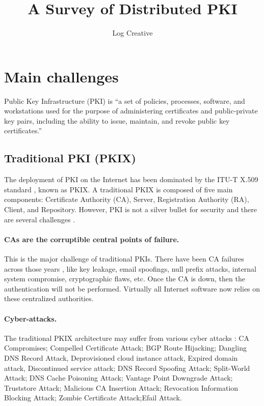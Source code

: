 \documentclass[lang=en]{sjtuarticle}
\title{A Survey of Distributed PKI}
\author{Log Creative}
\begin{document}
\maketitle

\tableofcontents*

\section{Main challenges}

Public Key Infrastructure (PKI) is ``a set of policies, processes, software, and workstations
used for the purpose of administering certificates and public-private key pairs, including the ability to
issue, maintain, and revoke public key certificates\cite{nist}.''

\subsection{Traditional PKI (PKIX)}

The deployment of PKI on the Internet has been dominated by the ITU-T X.509 standard \cite{pkix}, known as PKIX. A traditional PKIX is composed of five main components: Certificate Authority (CA), Server, Registration Authority (RA), Client, and Repository. However, PKI is not a silver bullet for security and there are several challenges \cite{ellison2000ten}.

\paragraph{CAs are the corruptible central points of failure.} This is the major challenge of traditional PKIs. There have been CA failures across those years \cite{pkixsurvey}, like key leakage, email spoofings, null prefix attacks, internal system compromise, cryptographic flaws, etc. Once the CA is down, then the authentication will not be performed. Virtually all Internet software now relies on these centralized authorities.

\paragraph{Cyber-attacks.} The traditional PKIX architecture may suffer from various cyber attacks \cite{pkixsurvey}: CA Compromises; Compelled Certificate Attack; BGP Route Hijacking; Dangling DNS Record Attack, Deprovisioned cloud instance attack, Expired domain attack, Discontinued service attack; DNS Record Spoofing Attack; Split-World Attack; DNS Cache Poisoning Attack; Vantage Point Downgrade Attack; Truststore Attack; Malicious CA Insertion Attack; Revocation Information Blocking Attack; Zombie Certificate Attack;Efail Attack.
\end{document}
